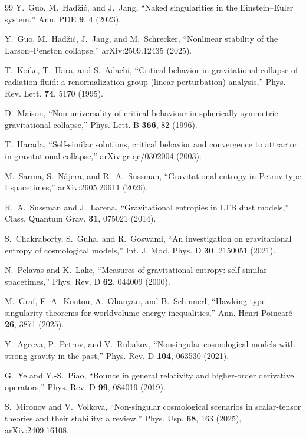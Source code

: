 \documentclass[11pt,letterpaper]{article}
\begin{document}
\begin{thebibliography}{99}
 Y.~Guo, M.~Had\v{z}i\'c, and J.~Jang, ``Naked singularities in the Einstein--Euler system,'' Ann. PDE \textbf{9}, 4 (2023).

 Y.~Guo, M.~Had\v{z}i\'c, J.~Jang, and M.~Schrecker, ``Nonlinear stability of the Larson--Penston collapse,'' arXiv:2509.12435 (2025).

 T.~Koike, T.~Hara, and S.~Adachi, ``Critical behavior in gravitational collapse of radiation fluid: a renormalization group (linear perturbation) analysis,'' Phys. Rev. Lett. \textbf{74}, 5170 (1995).

 D.~Maison, ``Non-universality of critical behaviour in spherically symmetric gravitational collapse,'' Phys. Lett. B \textbf{366}, 82 (1996).

 T.~Harada, ``Self-similar solutions, critical behavior and convergence to attractor in gravitational collapse,'' arXiv:gr-qc/0302004 (2003).

 M.~Sarma, S.~N\'ajera, and R.~A.~Sussman, ``Gravitational entropy in Petrov type I spacetimes,'' arXiv:2605.20611 (2026).

 R.~A.~Sussman and J.~Larena, ``Gravitational entropies in LTB dust models,'' Class. Quantum Grav. \textbf{31}, 075021 (2014).

 S.~Chakraborty, S.~Guha, and R.~Goswami, ``An investigation on gravitational entropy of cosmological models,'' Int. J. Mod. Phys. D \textbf{30}, 2150051 (2021).

 N.~Pelavas and K.~Lake, ``Measures of gravitational entropy: self-similar spacetimes,'' Phys. Rev. D \textbf{62}, 044009 (2000).

 M.~Graf, E.-A.~Kontou, A.~Ohanyan, and B.~Schinnerl, ``Hawking-type singularity theorems for worldvolume energy inequalities,'' Ann. Henri Poincar\'e \textbf{26}, 3871 (2025).

 Y.~Ageeva, P.~Petrov, and V.~Rubakov, ``Nonsingular cosmological models with strong gravity in the past,'' Phys. Rev. D \textbf{104}, 063530 (2021).

 G.~Ye and Y.-S.~Piao, ``Bounce in general relativity and higher-order derivative operators,'' Phys. Rev. D \textbf{99}, 084019 (2019).

 S.~Mironov and V.~Volkova, ``Non-singular cosmological scenarios in scalar-tensor theories and their stability: a review,'' Phys. Usp. \textbf{68}, 163 (2025), arXiv:2409.16108.


\end{thebibliography}
\end{document}
